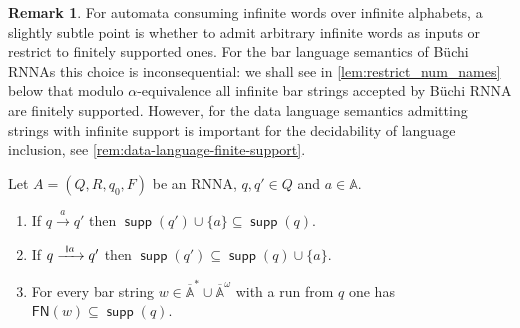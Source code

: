 \documentclass[10pt,a4paper]{amsart}
\newcommand{\resetCurThmBraces}{%
\gdef\curThmBraceOpen{(}%
\gdef\curThmBraceClose{)}}
\newcommand{\removeThmBraces}{%
\gdef\curThmBraceOpen{}%
\gdef\curThmBraceClose{}}
\newenvironment{notheorembrackets}{\removeThmBraces}{\resetCurThmBraces}
\newcommand{\scriptmidmid}{\hspace{0.2ex}{\rule[-0.1ex]{0.6pt}{1.1ex}}\hspace{0.2ex}}
\newcommand{\scriptnew}[1]{{\scriptmidmid}#1}
\newcommand{\FN}{\mathsf{FN}}
\newcommand{\barA}{\overline{\names}}
\numberwithin{equation}{section}
\newcommand{\xto}[1]{\xrightarrow{~#1~}}
\newcommand{\seq}{\subseteq}
\newcommand{\+}[1]{\mathcal{#1}\xspace}
\newcommand{\names}{\mathbb{A}}
\DeclareMathOperator{\supp}{\mathsf{supp}} %
\theoremstyle{definition}
\newtheorem{rem}[theorem]{Remark}
\begin{document}
\begin{rem}
  For automata consuming infinite words over infinite alphabets, a slightly subtle point is whether to admit arbitrary infinite words
  as inputs or restrict to finitely supported ones. For the bar language semantics of Büchi RNNAs this choice is inconsequential: we shall see in
  \autoref{lem:restrict_num_names} below that modulo
  $\alpha$-equivalence all infinite bar strings accepted by Büchi RNNA
  are finitely supported. However, for the data language semantics admitting strings with infinite support is important for the decidability of language inclusion, see \autoref{rem:data-language-finite-support}.
\end{rem}
%
\begin{notheorembrackets}
  \begin{lemma}\label{lem:rnna-props}
    Let $A=(Q,R,q_0,F)$ be an RNNA, $q,q'\in Q$ and $a\in \names$.
    \begin{enumerate}
    \item\label{lem:rnna-props:1} If $q\xto{a} q'$ then $\supp(q')\cup \{a\}\seq \supp(q)$.
    \item\label{lem:rnna-props:2} If $q\xto{\scriptnew a} q'$ then $\supp(q')\seq \supp(q)\cup \{a\}$. 
    \item\label{lem:rnna-props:3} For every bar string $w\in \barA^*\cup \barA^\omega$ with a run from $q$ one has $\FN(w)\seq \supp(q)$.
    \end{enumerate}
  \end{lemma}
\end{notheorembrackets}
\end{document}
